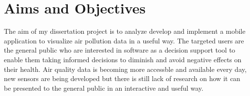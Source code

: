 \section{Aims and Objectives}
The aim of my dissertation project is to analyze develop and implement a mobile application to visualize air pollution data in a useful way. The targeted users are the general public who are interested in software as a decision support tool to enable them taking informed decisions to diminish and avoid negative effects on their health.
Air quality data is becoming more accessble and available every day, new sensors are being developed but there is still lack of research on how it can be presented to the general public in an interactive and useful way. 